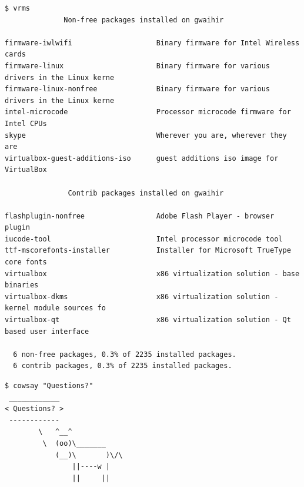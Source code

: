 \documentclass[14pt]{beamer}
\begin{document}
\begin{frame}[fragile]
\scriptsize
\begin{verbatim}
$ vrms
              Non-free packages installed on gwaihir

firmware-iwlwifi                    Binary firmware for Intel Wireless cards
firmware-linux                      Binary firmware for various drivers in the Linux kerne
firmware-linux-nonfree              Binary firmware for various drivers in the Linux kerne
intel-microcode                     Processor microcode firmware for Intel CPUs
skype                               Wherever you are, wherever they are
virtualbox-guest-additions-iso      guest additions iso image for VirtualBox

               Contrib packages installed on gwaihir

flashplugin-nonfree                 Adobe Flash Player - browser plugin
iucode-tool                         Intel processor microcode tool
ttf-mscorefonts-installer           Installer for Microsoft TrueType core fonts
virtualbox                          x86 virtualization solution - base binaries
virtualbox-dkms                     x86 virtualization solution - kernel module sources fo
virtualbox-qt                       x86 virtualization solution - Qt based user interface

  6 non-free packages, 0.3% of 2235 installed packages.
  6 contrib packages, 0.3% of 2235 installed packages.
\end{verbatim}
\end{frame}

\begin{frame}[fragile]
\begin{verbatim}
$ cowsay "Questions?"
 ____________
< Questions? >
 ------------
        \   ^__^
         \  (oo)\_______
            (__)\       )\/\
                ||----w |
                ||     ||
\end{verbatim}
\end{frame}
\end{document}
